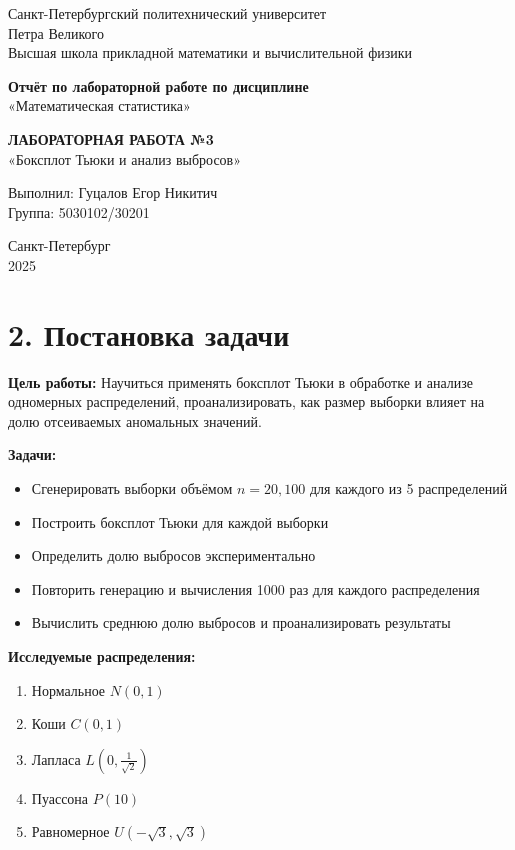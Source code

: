 \documentclass[a4paper,14pt]{extarticle}
\begin{document}
\begin{titlepage}
\begin{center}
\large
Санкт-Петербургский политехнический университет \\
Петра Великого \\
Высшая школа прикладной математики и вычислительной физики \\
\vspace{3cm}

\textbf{Отчёт по лабораторной работе по дисциплине} \\
«Математическая статистика» \\
\vspace{0.5cm}

\textbf{ЛАБОРАТОРНАЯ РАБОТА №3} \\
«Боксплот Тьюки и анализ выбросов» \\
\vspace{2cm}

Выполнил: Гуцалов Егор Никитич \\
Группа: 5030102/30201 \\
\vfill

Санкт-Петербург \\
2025
\end{center}
\end{titlepage}

\section*{2. Постановка задачи}

\textbf{Цель работы:} Научиться применять боксплот Тьюки в обработке и анализе одномерных распределений, проанализировать, как размер выборки влияет на долю отсеиваемых аномальных значений.

\textbf{Задачи:}
\begin{itemize}
    \item Сгенерировать выборки объёмом $n = 20, 100$ для каждого из 5 распределений
    \item Построить боксплот Тьюки для каждой выборки
    \item Определить долю выбросов экспериментально
    \item Повторить генерацию и вычисления 1000 раз для каждого распределения
    \item Вычислить среднюю долю выбросов и проанализировать результаты
\end{itemize}

\textbf{Исследуемые распределения:}
\begin{enumerate}
    \item Нормальное $N(0, 1)$
    \item Коши $C(0, 1)$
    \item Лапласа $L(0, \frac{1}{\sqrt{2}})$
    \item Пуассона $P(10)$
    \item Равномерное $U(-\sqrt{3}, \sqrt{3})$
\end{enumerate}
\end{document}
